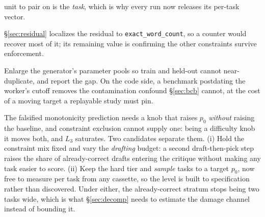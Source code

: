 \documentclass[11pt]{article}
\begin{document}
\begin{description}
    unit to pair on is the \emph{task}, which is why every run now releases its per-task vector.
  \item[D1$'$-tools (deterministic actuator).] \S\ref{sec:residual} localizes the residual to
    \texttt{exact\_word\_count}, so a counter would recover most of it; its remaining value is
    confirming the other constraints survive enforcement.
  \item[D8 (generalization).] Enlarge the generator's parameter pools so train and held-out
    cannot near-duplicate, and report the gap. On the code side, a benchmark postdating the
    worker's cutoff \citep{jain2024livecodebench} removes the contamination confound
    \S\ref{sec:bcb} cannot, at the cost of a moving target a replayable study must pin.
  \item[D9 (a high-$p_0$ level that does not saturate) --- \emph{the open design problem}.] The
    falsified monotonicity prediction needs a knob that raises $p_0$ \emph{without} raising the
    baseline, and constraint exclusion cannot supply one: being a difficulty knob it moves both,
    and $L_3$ saturates. Two candidates separate them. (i) Hold the constraint mix fixed and
    vary the \emph{drafting} budget: a second draft-then-pick step raises the share of
    already-correct drafts entering the critique without making any task easier to score.
    (ii) Keep the hard tier and \emph{sample} tasks to a target $p_0$, now free to measure per
    task from any cassette, so the level is built to specification rather than discovered. Under
    either, the already-correct stratum stops being two tasks wide, which is what
    \S\ref{sec:decomp} needs to estimate the damage channel instead of bounding it.
\end{description}
\end{document}

